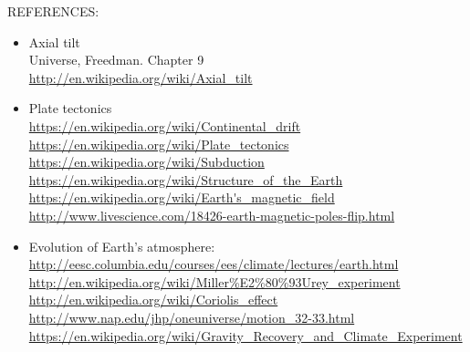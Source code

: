 REFERENCES:
\begin{itemize}
\item  Axial tilt
\\Universe, Freedman. Chapter 9 \\
\url{http://en.wikipedia.org/wiki/Axial_tilt}
\item Plate tectonics \\
\url{https://en.wikipedia.org/wiki/Continental_drift} \\
\url{https://en.wikipedia.org/wiki/Plate_tectonics} \\
\url{https://en.wikipedia.org/wiki/Subduction} \\
\url{https://en.wikipedia.org/wiki/Structure_of_the_Earth} \\
\url{https://en.wikipedia.org/wiki/Earth's_magnetic_field} \\
\url{http://www.livescience.com/18426-earth-magnetic-poles-flip.html}

\item Evolution of Earth’s atmosphere: \\
\url{http://eesc.columbia.edu/courses/ees/climate/lectures/earth.html} \\
\url{http://en.wikipedia.org/wiki/Miller\%E2\%80\%93Urey_experiment} \\
\url{http://en.wikipedia.org/wiki/Coriolis_effect} \\ 
\url{http://www.nap.edu/jhp/oneuniverse/motion_32-33.html} \\
\url{https://en.wikipedia.org/wiki/Gravity_Recovery_and_Climate_Experiment}
\end{itemize}
